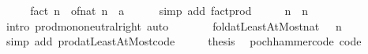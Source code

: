 \begin{isabellebody}
%
\isadelimproof
%
\endisadelimproof
%
\isatagproof
{}\isamarkupfalse%
\ {\isacharminus}{\kern0pt}\isanewline
\ \ \isamarkupfalse%
\ {\isachardoublequoteopen}fact\ n\ {\isacharequal}{\kern0pt}\ {\isacharparenleft}{\kern0pt}of{\isacharunderscore}{\kern0pt}nat\ {\isacharparenleft}{\kern0pt}{\isasymProd}{\isacharbraceleft}{\kern0pt}{}{\isachardot}{\kern0pt}{\isachardot}{\kern0pt}n{\isacharbraceright}{\kern0pt}{\isacharparenright}{\kern0pt}\ {\isacharcolon}{\kern0pt}{\isacharcolon}{\kern0pt}\ {\isacharprime}{\kern0pt}a{\isacharparenright}{\kern0pt}{\isachardoublequoteclose}\isanewline
\ \ \ \ \isamarkupfalse%
\ {\isacharparenleft}{\kern0pt}simp\ add{\isacharcolon}{\kern0pt}\ fact{\isacharunderscore}{\kern0pt}prod{\isacharparenright}{\kern0pt}\isanewline
\ \ \isamarkupfalse%
\ \isamarkupfalse%
\ {\isachardoublequoteopen}{\isasymProd}{\isacharbraceleft}{\kern0pt}{}{\isachardot}{\kern0pt}{\isachardot}{\kern0pt}n{\isacharbraceright}{\kern0pt}\ {\isacharequal}{\kern0pt}\ {\isasymProd}{\isacharbraceleft}{\kern0pt}{}{\isachardot}{\kern0pt}{\isachardot}{\kern0pt}n{\isacharbraceright}{\kern0pt}{\isachardoublequoteclose}\isanewline
\ \ \ \ \isamarkupfalse%
\ {\isacharparenleft}{\kern0pt}intro\ prod{\isachardot}{\kern0pt}mono{\isacharunderscore}{\kern0pt}neutral{\isacharunderscore}{\kern0pt}right{\isacharparenright}{\kern0pt}\ auto\isanewline
\ \ \isamarkupfalse%
\ \isamarkupfalse%
\ {\isachardoublequoteopen}{\isasymdots}\ {\isacharequal}{\kern0pt}\ fold{\isacharunderscore}{\kern0pt}atLeastAtMost{\isacharunderscore}{\kern0pt}nat\ {\isacharparenleft}{\kern0pt}{\isacharparenleft}{\kern0pt}{\isacharasterisk}{\kern0pt}{\isacharparenright}{\kern0pt}{\isacharparenright}{\kern0pt}\ {}\ n\ {}{\isachardoublequoteclose}\isanewline
\ \ \ \ \isamarkupfalse%
\ {\isacharparenleft}{\kern0pt}simp\ add{\isacharcolon}{\kern0pt}\ prod{\isacharunderscore}{\kern0pt}atLeastAtMost{\isacharunderscore}{\kern0pt}code{\isacharparenright}{\kern0pt}\isanewline
\ \ \isamarkupfalse%
\ \isamarkupfalse%
\ {\isacharquery}{\kern0pt}thesis\ \isacommand{{\isachardot}{\kern0pt}}\isamarkupfalse%
\isanewline
{}\isamarkupfalse%
%
\endisatagproof
{\isafoldproof}%
%
\isadelimproof
\isanewline
%
\endisadelimproof
\isanewline
{}\isamarkupfalse%
\ pochhammer{\isacharunderscore}{\kern0pt}code\ {\isacharbrackleft}{\kern0pt}code{\isacharbrackright}{\kern0pt}{\isacharcolon}{\kern0pt}\isanewline

\end{isabellebody}
